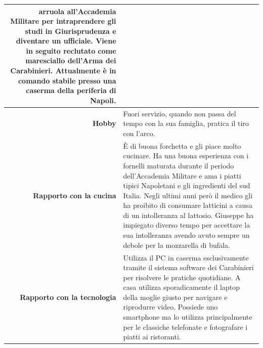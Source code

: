 \begin{table}[H]
\begin{centering}
\begin{tabular} { | r  p{12cm} | }
arruola all'Accademia Militare per intraprendere gli studi in
Giurisprudenza e diventare un ufficiale. Viene in seguito reclutato come
maresciallo dell'Arma dei Carabinieri. Attualmente è in comando stabile
presso una caserma della periferia di Napoli. \\\hline
		\textbf{Hobby} & Fuori servizio, quando non passa del tempo con
la sua famiglia, pratica il tiro con l'arco.\\ \hline
		\textbf{Rapporto con la cucina} & È di buona forchetta e gli
piace molto cucinare. Ha una buona esperienza con i fornelli maturata
durante il periodo dell'Accademia Militare e ama i piatti tipici
Napoletani e gli ingredienti del sud Italia. Negli ultimi anni però il
medico gli ha proibito di consumare latticini a causa di un intolleranza al
lattosio. Giuseppe ha impiegato diverso tempo per accettare la sua
intolleranza avendo avuto sempre un debole per la mozzarella di bufala.\\ \hline
		\textbf{Rapporto con la tecnologia} & Utilizza il PC in caserma
esclusivamente tramite il sistema software dei Carabinieri per risolvere
le pratiche quotidiane. A casa utilizza sporadicamente il
laptop della moglie giusto per navigare e riprodurre video. Possiede uno
smartphone ma lo utilizza principalmente per le classiche telefonate e fotografare i
piatti ai ristoranti.\\ \hline
	\end{tabular}
	\end{centering}
\end{table}
